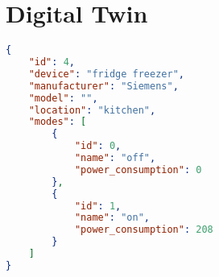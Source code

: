 \chapter{Digital Twin}\label{ch:digital_twin}

\begin{lstlisting}[language=json,caption={JSON file describing the fridge.},label=fridge_json,float,floatplacement=H]
{
    "id": 4,
    "device": "fridge freezer",
    "manufacturer": "Siemens",
    "model": "",
    "location": "kitchen",
    "modes": [
        {
            "id": 0,
            "name": "off",
            "power_consumption": 0
        },
        {
            "id": 1,
            "name": "on",
            "power_consumption": 208
        }
    ]
}
\end{lstlisting}